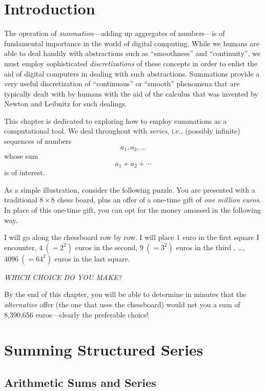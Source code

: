 \documentclass{article}
\begin{document}
\section{Introduction}
\label{sec:intro}

The operation of {\it summation}---adding up aggregates of
numbers---is of fundamental importance in the world of digital
computing.  While we humans are able to deal handily with abstractions
such as ``smoothness'' and ``continuity'', we must employ
sophisticated {\em discretizations} of these concepts in order to
enlist the aid of digital computers in dealing with such abstractions.
Summations provide a very useful discretization of ``continuous'' or
``smooth'' phenomena that are typically dealt with by humans with the
aid of the calculus that was invented by Newton and Leibnitz for such
dealings.

This chapter is dedicated to exploring how to employ summations as a
computational tool.  We deal throughout with {\it series}, i.e.,
(possibly infinite) sequences of numbers
\[ a_1, a_2, \ldots \]
whose sum
\[ a_1 + a_2 + \cdots \]
is of interest.

As a simple illustration, consider the following puzzle.  You are
presented with a traditional $8 \times 8$ chess board, plus an offer
of a one-time gift of {\em one million euros}.  In place of this
one-time gift, you can opt for the money amassed in the following
way.

\noindent
%
I will go along the chessboard row by row.  I will place $1$ euro in
the first square I encounter, $4 \ (= 2^2)$ euros in the second, $9
\ (= 3^2)$ euros in the third , \ldots, $4096 \ (= 64^2)$ euros in the
last square.

\noindent
{\em WHICH CHOICE DO YOU MAKE?}

\medskip

By the end of this chapter, you will be able to determine in minutes
that the {\em alternative} offer (the one that uses the chessboard)
would net you a sum of 8,390,656 euros---clearly the preferable
choice!



\section{Summing Structured Series}
\label{sec:structured-series}

\subsection{Arithmetic Sums and Series}
\label{sec:arithmetic-series}
\end{document}
